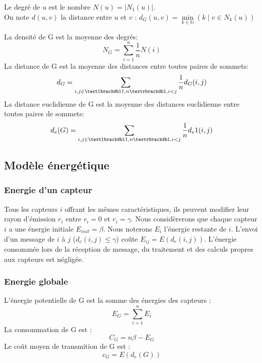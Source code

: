 \begin{mydef}
 Le degré de $ u $ est le nombre  $N(u)=|N_1(u)|$.\\
 On note $d(u,v)$ la distance entre $ u $ et $ v $ : $d_G(u,v)= \min\limits_{k \in \mathbb{N}}(k \mid v \in N_k(u))$
\end{mydef}

\begin{mydef}%
 La densité de G est la moyenne des degrés:$$N_G=\sum_{i=1}^n{\frac1n N(i)}$$
 La distance de G est la moyenne des distances entre toutes paires de sommets:$$d_G=\sum_{i,j\in \textlbrackdbl 1,n \textrbrackdbl,i<j}{\frac1n d_G(i,j)}$$
 La distance euclidienne de G est la moyenne des distances euclidienne entre toutes paires de sommets:$$d_e(G)=\sum_{i,j\in \textlbrackdbl 1,n \textrbrackdbl,i<j}{\frac1n d_e1(i,j)}$$

\end{mydef}

\subsection{Modèle énergétique}
\subsubsection{Energie d'un capteur}
Tous les capteurs $i$ offrant les mêmes caractéristiques, ils peuvent modifier leur rayon d'émission $r_i$ entre $r_i=0$ et $r_i=\gamma$.
Nous considèrerons que chaque capteur $i$ a une énergie initiale $E_{init}=\beta$.
Nous noterons $E_i$ l'énergie restante de $i$.
L'envoi d'un message de $i$ à $j$ ($d_e(i,j)\leq \gamma$) coûte  $ E_{ij}=E(d_e(i,j))$.
L'énergie consommée lors de la réception de message, du traitement et des calculs propres aux capteurs est négligée.


\subsubsection{Energie globale}
\begin{mydef}
 L'énergie potentielle de G est la somme des énergies des capteurs :$$E_G=\sum_{i=1}^n{E_i}$$
 La consommation de  G est :$$C_G=n\beta - E_G$$
 Le coût moyen de transmition de  G est :$$c_G=E(d_e(G))$$

\end{mydef}

